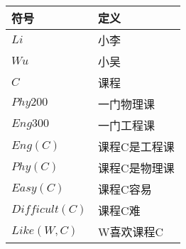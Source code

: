 \begin{answer}
	\ \\
	\begin{tabular}{ll}
		\hline
		符号&定义\\
		\hline
		$Li$&小李\\
		$Wu$&小吴\\
		$C$&课程\\
		$Phy200$&一门物理课\\
		$Eng300$&一门工程课\\
		$Eng(C)$&课程C是工程课\\
		$Phy(C)$&课程C是物理课\\
		$Easy(C)$&课程C容易\\
		$Difficult(C)$&课程C难\\
		$Like(W,C)$&W喜欢课程C\\
		\hline
	\end{tabular}\\

\end{answer}
